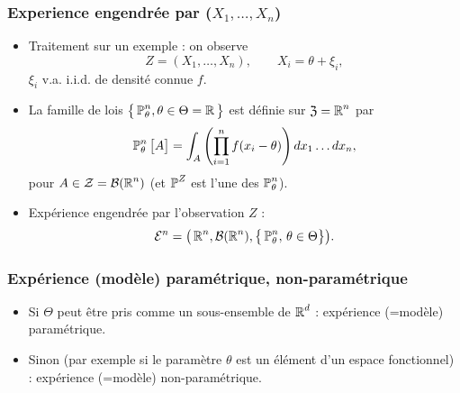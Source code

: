 \begin{frame}
\frametitle{Experience engendrée par ($X_1,\ldots, X_n$)}
\begin{itemize}
\item \alert{Traitement sur un exemple} : on observe
$$Z = (X_1,\ldots, X_n), \quad\quad X_i= \theta + \xi_i,$$
$\xi_i$ v.a. i.i.d. de densit\'e \alert{ connue} $f$.
\item La famille de lois $\big\{\operatorname{{\mathbb P}}_\theta^n,\theta \in \Theta  =
\operatorname{{\mathbb R}}\big\}$ est définie sur $\mathfrak{Z}=\operatorname{{\mathbb R}}^n$ par
$$\operatorname{{\mathbb P}}_\theta^n\big[A\big] = \int_A
\left(\prod_{i=1}^n f(x_i-\theta)\right) dx_1\ldots dx_n,
$$
pour $A\in{\mathcal Z}= {\mathcal B}(\operatorname{{\mathbb R}}^n)$ (et $\operatorname{{\mathbb P}}^Z$ est l'une
des $\operatorname{{\mathbb P}}_\theta^n$).
\item Expérience \alert{engendrée par l'observation $Z$} :
$${\mathcal E}^n = \big(\operatorname{{\mathbb R}}^n,{\mathcal B}(\operatorname{{\mathbb R}}^n),\big\{\operatorname{{\mathbb P}}_\theta^n,\,\theta \in \Theta\big\}\big).$$
\end{itemize}
\end{frame}


\begin{frame}
\frametitle{Expérience (mod\`ele) paramétrique, non-paramétrique}
\begin{itemize}
\item Si $\Theta$ peut être \og pris \fg{} comme un sous-ensemble
de $\operatorname{{\mathbb R}}^d$ : \alert{ expérience (=mod\`ele) paramétrique}.
\item Sinon (par exemple si le paramètre $\theta$ est un élément d'un espace fonctionnel) : \alert{ expérience (=mod\`ele) non-paramétrique}.
\end{itemize}
\end{frame}

